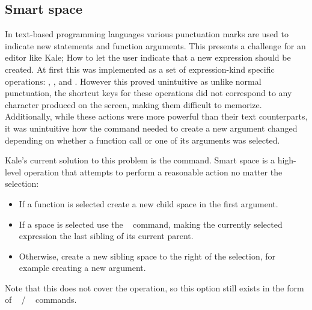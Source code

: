 \subsection{Smart space}
In text-based programming languages various punctuation marks are used to
indicate new statements and function arguments.
This presents a challenge for an editor like Kale; How
to let the user indicate that a new expression should be created.
At first this was implemented as a set of
expression-kind specific operations: , , and . However this proved unintuitive as
unlike normal punctuation, the shortcut keys for these operations did not correspond
to any character produced on the screen, making them difficult to memorize.
Additionally, while these actions were more powerful than their text counterparts,
it was unintuitive how the command needed to create a new argument changed
depending on whether a function call or one of its arguments was selected.

Kale's current solution to this problem is the
\hyperref[cmd:smart_space]{} command. Smart space is a
high-level operation that attempts to perform a reasonable action no matter the
selection:

\begin{samepage}
\begin{itemize}
	\item If a function is selected create a new child space in the first
argument.
	\item If a space is selected use the
	\hyperref[cmd:up_down]{}~ command,
	making the currently selected expression the last sibling of its
	current parent.
	\item Otherwise, create a new sibling space to the right of the selection, for
example creating a new argument.
\end{itemize}
\end{samepage}

Note that this does not cover the  operation, so this
option still exists in the form of
\hyperref[cmd:new_line]{}~ /
\hyperref[cmd:new_line]{}~ commands.


